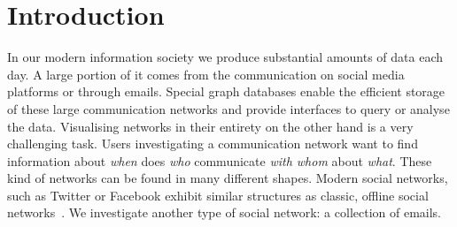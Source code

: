 \section{Introduction}


In our modern information society we produce substantial amounts of data each day.
A large portion of it comes from the communication on social media platforms or through emails.
Special graph databases enable the efficient storage of these large communication networks and provide interfaces to query or analyse the data.
Visualising networks in their entirety on the other hand is a very challenging task.
Users investigating a communication network want to find information about \textit{when} does \textit{who} communicate \textit{with whom} about \textit{what}.
These kind of networks can be found in many different shapes.
Modern social networks, such as Twitter or Facebook exhibit similar structures as classic, offline social networks~\cite{subrahmanyam2008online}.
We investigate another type of social network: a collection of emails.

